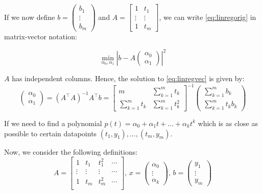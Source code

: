 If we now define
$b=\begin{pmatrix} b_1 \\ \vdots \\ b_m \end{pmatrix}$
and $A=\begin{bmatrix} 1 & t_1 \\ \vdots & \vdots \\ 1 & t_m \end{bmatrix}$,
we can write \eqref{eq:linregorig} in matrix-vector notation:

\begin{equation}
    \min_{\alpha_0,\alpha_1}
    \left|
    b-A\begin{pmatrix} \alpha_0 \\ \alpha_1 \end{pmatrix}
    \right|
    ^2
    \label{eq:linregvec}
\end{equation}

$A$ has independent columns. Hence, the solution to \eqref{eq:linregvec} is given by:
\begin{equation*}
\begin{pmatrix}
    \alpha_0 \\
    \alpha_1
\end{pmatrix}
= (A^\top A)^{-1}A^\top b =
\begin{bmatrix}
    m & \sum^m_{k=1} t_k \\
    \sum^m_{k=1} t_k & \sum^m_{k=1} t_k^2
\end{bmatrix}^{-1}
\begin{pmatrix}
    \sum^m_{k=1} b_k \\
    \sum^m_{k=1} t_k b_k
\end{pmatrix}
\end{equation*}

If we need to find a polynomial $p(t) = \alpha_0 + \alpha_1 t + \dots + \alpha_k t^k$ which is as
close as possible to certain datapoints $(t_1, y_1), \dots, (t_m, y_m)$.

Now, we consider the following definitions:
$$A = \begin{bmatrix}
    1 & t_1 & t_1^2 & \cdots \\
    \vdots & \vdots & \vdots & \cdots \\
    1 & t_m & t_m^2 & \cdots \\
\end{bmatrix}, \,
x = \begin{pmatrix}
    \alpha_0 \\ \vdots \\ \alpha_k
\end{pmatrix}, \,
b = \begin{pmatrix}
    y_1 \\ \vdots \\ y_m
\end{pmatrix}$$

